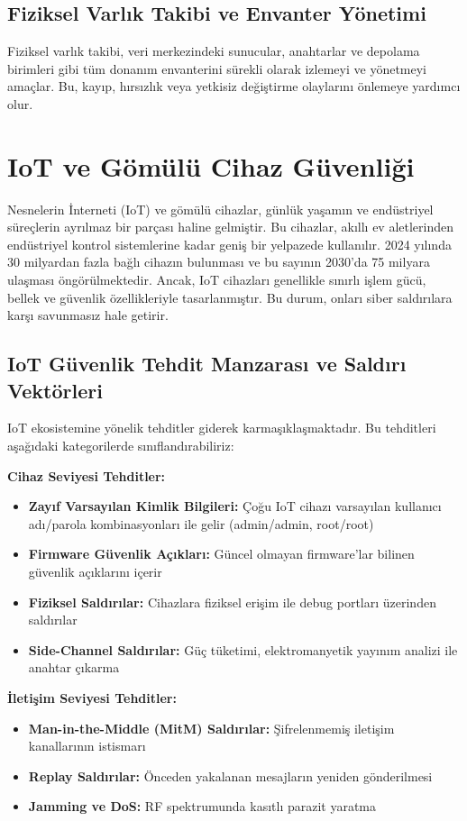 \subsection{Fiziksel Varlık Takibi ve Envanter Yönetimi}

Fiziksel varlık takibi, veri merkezindeki sunucular, anahtarlar ve depolama birimleri gibi tüm donanım envanterini sürekli olarak izlemeyi ve yönetmeyi amaçlar. Bu, kayıp, hırsızlık veya yetkisiz değiştirme olaylarını önlemeye yardımcı olur.

\section{IoT ve Gömülü Cihaz Güvenliği}
Nesnelerin İnterneti (IoT) ve gömülü cihazlar, günlük yaşamın ve endüstriyel süreçlerin ayrılmaz bir parçası haline gelmiştir. Bu cihazlar, akıllı ev aletlerinden endüstriyel kontrol sistemlerine kadar geniş bir yelpazede kullanılır. 2024 yılında 30 milyardan fazla bağlı cihazın bulunması ve bu sayının 2030'da 75 milyara ulaşması öngörülmektedir. Ancak, IoT cihazları genellikle sınırlı işlem gücü, bellek ve güvenlik özellikleriyle tasarlanmıştır. Bu durum, onları siber saldırılara karşı savunmasız hale getirir.

\subsection{IoT Güvenlik Tehdit Manzarası ve Saldırı Vektörleri}

IoT ekosistemine yönelik tehditler giderek karmaşıklaşmaktadır. Bu tehditleri aşağıdaki kategorilerde sınıflandırabiliriz:

\textbf{Cihaz Seviyesi Tehditler:}
\begin{itemize}
    \item \textbf{Zayıf Varsayılan Kimlik Bilgileri:} Çoğu IoT cihazı varsayılan kullanıcı adı/parola kombinasyonları ile gelir (admin/admin, root/root)
    \item \textbf{Firmware Güvenlik Açıkları:} Güncel olmayan firmware'lar bilinen güvenlik açıklarını içerir
    \item \textbf{Fiziksel Saldırılar:} Cihazlara fiziksel erişim ile debug portları üzerinden saldırılar
    \item \textbf{Side-Channel Saldırılar:} Güç tüketimi, elektromanyetik yayınım analizi ile anahtar çıkarma
\end{itemize}

\textbf{İletişim Seviyesi Tehditler:}
\begin{itemize}
    \item \textbf{Man-in-the-Middle (MitM) Saldırılar:} Şifrelenmemiş iletişim kanallarının istismarı
    \item \textbf{Replay Saldırılar:} Önceden yakalanan mesajların yeniden gönderilmesi
    \item \textbf{Jamming ve DoS:} RF spektrumunda kasıtlı parazit yaratma
\end{itemize}

